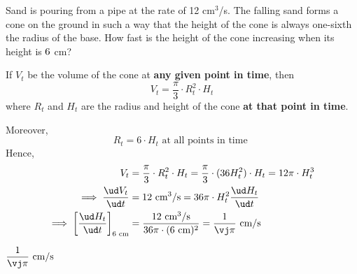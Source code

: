 

\question[2] Sand is pouring from a pipe at the rate of 12 cm$^3$/s.
The falling sand forms a cone on the ground in such a way that the height of the
cone is always one-sixth the radius of the base. How fast is the height of the
cone increasing when its height is $6$ cm? 

\watchout

\SQUARE\vh\vi
\MULTIPLY{}\vj

\begin{solution}[\halfpage]
  If $V_t$ be the volume of the cone at \textbf{any given point in time}, then 
  \[ V_t = \dfrac\pi{3}\cdot R_t^2\cdot H_t \]
  where $R_t$ and $H_t$ are the radius and height of the cone \textbf{at that point in time}.

  Moreover, 
  \[ R_t = 6\cdot H_t\text{ at all points in time }\]
  Hence, 
  \begin{align}
    V_t &= \dfrac\pi{3}\cdot R_t^2 \cdot H_t = \dfrac\pi{3}\cdot (36 H_t^2)\cdot H_t = 12\pi\cdot H_t^3 \\
    \implies\dfrac{\ud V_t}{\ud t} &= 12\text{ cm}^3\text{/s} = 36\pi\cdot H_t^2\dfrac{\ud H_t}{\ud t} \\
    \implies \left[\dfrac{\ud H_t}{\ud t}\right]_{\vh\text{ cm}} &= \dfrac{12\text{ cm}^3\text{/s}}{36\pi\cdot (\vh\text{ cm})^2} 
    = \dfrac{1}{\vj\pi}\text{ cm/s}
  \end{align}
\end{solution}
\ifprintanswers
  \begin{codex}
    $\dfrac{1}{\vj\pi}\text{ cm/s}$
  \end{codex}
\fi
